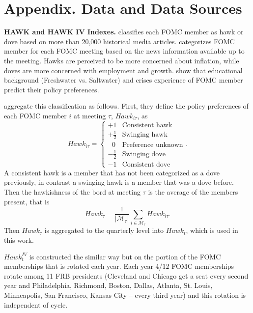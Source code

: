 \documentclass[11pt]{article}
\begin{document}





\newpage
\appendix


\section{Appendix. Data and Data Sources} 
\label{seq:data}


\noindent\textbf{HAWK and HAWK IV Indexes.} \citet{Istrefi2019} classifies each FOMC member as hawk or dove based on more than 20,000 historical media articles. 
\citet{Istrefi2019} categorizes FOMC member for each FOMC meeting based on the news information available up to the meeting. 
Hawks are perceived to be more concerned about inflation, while doves are more concerned with employment and growth. 
\citet{BordoIstrefi2023} show that educational background (Freshwater vs. Saltwater) and crises experience of FOMC member predict their policy preferences.

\citet{HIM2023} aggregate this classification as follows. First, they define the policy preferences of each FOMC member $i$ at meeting $\tau$, $\mathit{Hawk}_{i\tau}$, as 
\[\textit{Hawk}_{i\tau}=\begin{cases}
  +1&\text{Consistent hawk}\\
  +\frac{1}{2}&\text{Swinging hawk}\\ ~~\, 0&\text{Preference unknown}\\ 
  -\frac{1}{2}&\text{Swinging dove}\\ 
  -1&\text{Consistent dove}
\end{cases}.\]
A consistent hawk is a member that has not been categorized as a dove previously, in contrast a swinging hawk is a member that was a dove before. Then the hawkishness of the bord at meeting $\tau$ is the average of the members present, that is
\[\textit{Hawk}_{\tau}=\frac{1}{\left|\mathcal{M}_\tau\right|}\sum_{i\in \mathcal{M}_\tau}\textit{Hawk}_{i\tau}.\]
Then $\textit{Hawk}_{\tau}$ is aggregated to the quarterly level into $\mathit{Hawk}_t$, which is used in this work.

$\mathit{Hawk}_t^\mathit{IV}$ is constructed the similar way but on the portion of the FOMC memberships that is rotated each year. Each year 4/12 FOMC memberships rotate among 11 FRB presidents (Cleveland and Chicago get a seat every second year and Philadelphia, Richmond, Boston, Dallas, Atlanta, St. Louis, Minneapolis, San Francisco, Kansas City -- every third year) and this rotation is independent of cycle.
\end{document}
